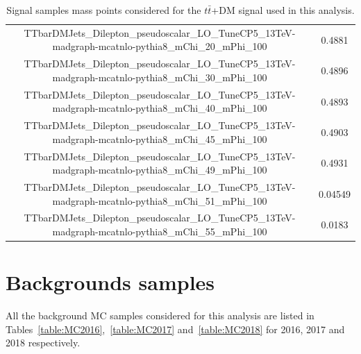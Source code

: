 \documentclass[a4paper, 10pt, openright]{report}
\begin{document}
\begin{appendices}
\begin{table}
\begin{center}
{\begin{tabular}{ c|c }
 TTbarDMJets\_Dilepton\_pseudoscalar\_LO\_TuneCP5\_13TeV-madgraph-mcatnlo-pythia8\_mChi\_20\_mPhi\_100 & 0.4881 \\
 TTbarDMJets\_Dilepton\_pseudoscalar\_LO\_TuneCP5\_13TeV-madgraph-mcatnlo-pythia8\_mChi\_30\_mPhi\_100 & 0.4896 \\
 TTbarDMJets\_Dilepton\_pseudoscalar\_LO\_TuneCP5\_13TeV-madgraph-mcatnlo-pythia8\_mChi\_40\_mPhi\_100 & 0.4893 \\
 TTbarDMJets\_Dilepton\_pseudoscalar\_LO\_TuneCP5\_13TeV-madgraph-mcatnlo-pythia8\_mChi\_45\_mPhi\_100 & 0.4903 \\
 TTbarDMJets\_Dilepton\_pseudoscalar\_LO\_TuneCP5\_13TeV-madgraph-mcatnlo-pythia8\_mChi\_49\_mPhi\_100 & 0.4931 \\
 TTbarDMJets\_Dilepton\_pseudoscalar\_LO\_TuneCP5\_13TeV-madgraph-mcatnlo-pythia8\_mChi\_51\_mPhi\_100 & 0.04549 \\
 TTbarDMJets\_Dilepton\_pseudoscalar\_LO\_TuneCP5\_13TeV-madgraph-mcatnlo-pythia8\_mChi\_55\_mPhi\_100 & 0.0183 \\
 \hline
\end{tabular}
}
\caption{Signal samples mass points considered for the $t \bar t$+DM signal used in this analysis.}
\label{table:ttDMsignals}
\end{center}
\end{table}

\section{Backgrounds samples}  \label{appendix:BkgSamples}

All the background \ac{MC} samples considered for this analysis are listed in Tables~\ref{table:MC2016},~\ref{table:MC2017} and~\ref{table:MC2018} for 2016, 2017 and 2018 respectively.


\end{appendices}
\end{document}
